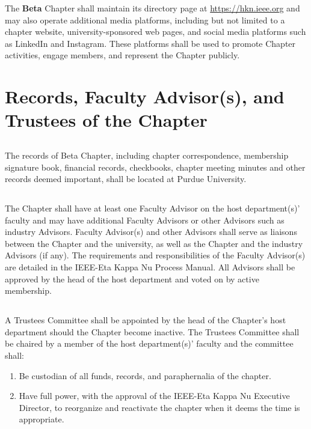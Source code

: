 \documentclass[10pt, oneside]{article}
\begin{document}
The \textbf{Beta} Chapter shall maintain its directory page at \url{https://hkn.ieee.org} and may also operate additional media platforms, including but not limited to a chapter website, university-sponsored web pages, and social media platforms such as LinkedIn and Instagram. These platforms shall be used to promote Chapter activities, engage members, and represent the Chapter publicly.

\section{Records, Faculty Advisor(s), and Trustees of the Chapter}
\subsection{}
The records of Beta Chapter, including chapter correspondence, membership signature book, financial records, checkbooks, chapter meeting minutes and other records deemed important, shall be located at Purdue University.
\subsection{}
The Chapter shall have at least one Faculty Advisor on the host department(s)’ faculty and may have additional Faculty Advisors or other Advisors such as industry Advisors.
Faculty Advisor(s) and other Advisors shall serve as liaisons between the Chapter and the university, as well as the Chapter and the industry Advisors (if any). The requirements and responsibilities of the Faculty Advisor(s) are detailed in the IEEE-Eta Kappa Nu Process Manual. All Advisors shall be approved by the head of the host department and voted on by active membership.

\subsection{}
A Trustees Committee shall be appointed by the head of the Chapter’s host department should the Chapter become inactive. The Trustees Committee shall be chaired by a member of the host department(s)’ faculty and the committee shall:
\begin{enumerate}[label=\alph*.]
\item Be custodian of all funds, records, and paraphernalia of the chapter.
\item Have full power, with the approval of the IEEE-Eta Kappa Nu Executive
Director, to reorganize and reactivate the chapter when it deems the time is appropriate.
\end{enumerate}
\end{document}
